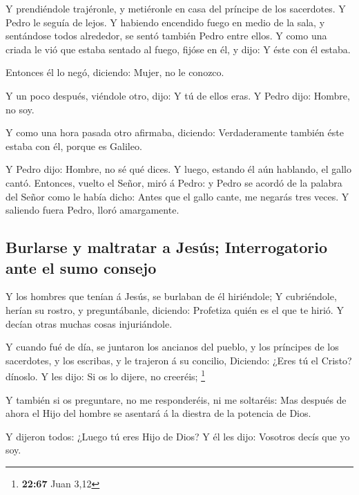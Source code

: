  Y prendiéndole trajéronle, y metiéronle en casa del
príncipe de los sacerdotes. Y Pedro le seguía de lejos. 
Y habiendo encendido fuego en medio de la sala, y sentándose todos
alrededor, se sentó también Pedro entre ellos.  Y como
una criada le vió que estaba sentado al fuego, fijóse en él, y dijo: Y
éste con él estaba.

 Entonces él lo negó, diciendo: Mujer, no le conozco.

 Y un poco después, viéndole otro, dijo: Y tú de ellos
eras. Y Pedro dijo: Hombre, no soy.

 Y como una hora pasada otro afirmaba, diciendo:
Verdaderamente también éste estaba con él, porque es Galileo.

 Y Pedro dijo: Hombre, no sé qué dices. Y luego, estando
él aún hablando, el gallo cantó.  Entonces, vuelto el
Señor, miró á Pedro: y Pedro se acordó de la palabra del Señor como le
había dicho: Antes que el gallo cante, me negarás tres veces.
 Y saliendo fuera Pedro, lloró amargamente.

\hypertarget{burlarse-y-maltratar-a-jesuxfas-interrogatorio-ante-el-sumo-consejo}{%
\subsection{Burlarse y maltratar a Jesús; Interrogatorio ante el sumo
consejo}\label{burlarse-y-maltratar-a-jesuxfas-interrogatorio-ante-el-sumo-consejo}}

 Y los hombres que tenían á Jesús, se burlaban de él
hiriéndole;  Y cubriéndole, herían su rostro, y
preguntábanle, diciendo: Profetiza quién es el que te hirió.
 Y decían otras muchas cosas injuriándole.

 Y cuando fué de día, se juntaron los ancianos del
pueblo, y los príncipes de los sacerdotes, y los escribas, y le trajeron
á su concilio,  Diciendo: ¿Eres tú el Cristo? dínoslo. Y
les dijo: Si os lo dijere, no creeréis; \footnote{\textbf{22:67} Juan
  3,12}

 Y también si os preguntare, no me responderéis, ni me
soltaréis:  Mas después de ahora el Hijo del hombre se
asentará á la diestra de la potencia de Dios.

 Y dijeron todos: ¿Luego tú eres Hijo de Dios? Y él les
dijo: Vosotros decís que yo soy.


